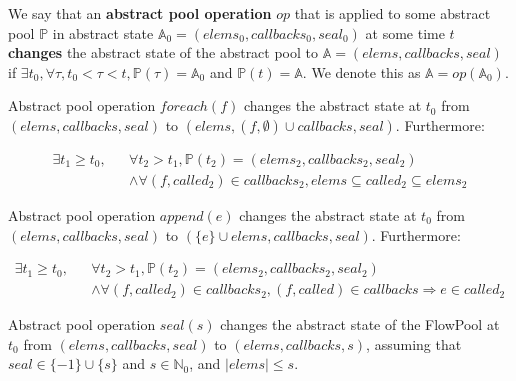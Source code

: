 \begin{definitiontwo}
We say that an \textbf{abstract pool operation} $op$ that is applied to some
abstract pool $\mathbb{P}$ in abstract state $\mathbb{A}_0 = (elems_0, callbacks_0, seal_0)$
at some time $t$ \textbf{changes} the abstract state of the abstract
pool to $\mathbb{A} = (elems, callbacks, seal)$ if $\exists t_0,
\forall \tau, t_0 < \tau < t, \mathbb{P}(\tau) = \mathbb{A}_0$
and $\mathbb{P}(t) = \mathbb{A}$.
We denote this as $\mathbb{A} = op(\mathbb{A}_0)$.

Abstract pool operation $foreach(f)$ changes the abstract state at $t_0$ from $(elems, callbacks, seal)$
to $(elems, (f, \emptyset) \cup callbacks, seal)$. Furthermore:

\vspace{-1cm}
\begin{align*}
\exists t_1 \geq t_0, & & \forall t_2 > t_1, \mathbb{P}(t_2) = (elems_2,
callbacks_2, seal_2) \\
& & \wedge \forall (f, called_2) \in callbacks_2, elems \subseteq
called_2 \subseteq elems_2
\end{align*}

Abstract pool operation $append(e)$ changes the abstract state at $t_0$ from
$(elems, callbacks, seal)$ to $(\{e\} \cup elems, callbacks, seal)$. Furthermore:

\vspace{-1cm}
\begin{align*}
\exists t_1 \geq t_0, & & \forall t_2 > t_1, \mathbb{P}(t_2) = (elems_2,
callbacks_2, seal_2) \\
& & \wedge \forall (f, called_2) \in callbacks_2, (f, called) \in
callbacks \Rightarrow e \in called_2
\end{align*}

Abstract pool operation $seal(s)$ changes the abstract state of the
FlowPool at $t_0$ from $(elems, callbacks, seal)$ to $(elems,
callbacks, s)$, assuming that $seal \in \{-1\} \cup \{s\}$ and $s \in
\mathbb{N}_0$, and $|elems| \leq s$.
\end{definitiontwo}


